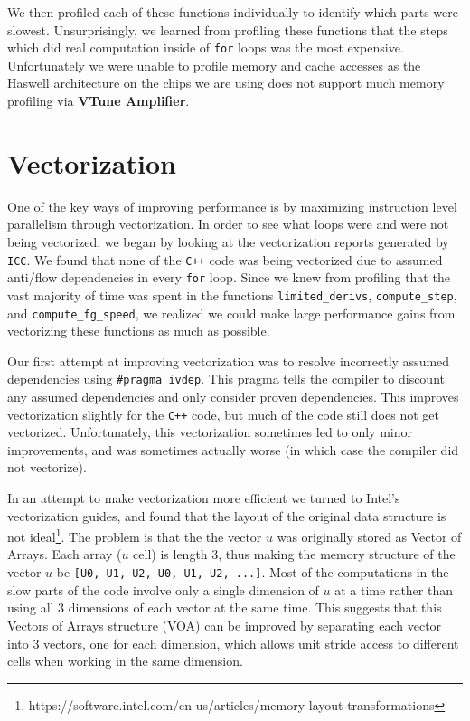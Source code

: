 \documentclass[11pt]{article}
\newcommand{\ttt}{\texttt}
\begin{document}
We then profiled each of these functions individually to identify which parts were slowest. Unsurprisingly, we learned from profiling these functions that the steps which did real computation inside of \ttt{for} loops was the most expensive. Unfortunately we were unable to profile memory and cache accesses as the Haswell architecture on the chips we are using does not support much memory profiling via \textbf{VTune Amplifier}.

\section{Vectorization}

One of the key ways of improving performance is by maximizing instruction level parallelism through vectorization. In order to see what loops were and were not being vectorized, we began by looking at the vectorization reports generated by \ttt{ICC}. We found that none of the \ttt{C++} code was being vectorized due to assumed anti/flow dependencies in every \ttt{for} loop. Since we knew from profiling that the vast majority of time was spent in the functions \ttt{limited\_derivs}, \ttt{compute\_step}, and \ttt{compute\_fg\_speed}, we realized we could make large performance gains from vectorizing these functions as much as possible.

Our first attempt at improving vectorization was to resolve incorrectly assumed dependencies using \ttt{\#pragma ivdep}. This pragma tells the compiler to discount any assumed dependencies and only consider proven dependencies. This improves vectorization slightly for the \ttt{C++} code, but much of the code still does not get vectorized. Unfortunately, this vectorization sometimes led to only minor improvements, and was sometimes actually worse (in which case the compiler did not vectorize).

In an attempt to make vectorization more efficient we turned to Intel's vectorization guides, and found that the layout of the original data structure is not ideal\footnote{https://software.intel.com/en-us/articles/memory-layout-transformations}. The problem is that the the vector $u$ was originally stored as Vector of Arrays. Each array ($u$ cell) is length 3, thus making the memory structure of the vector $u$ be \ttt{[U0, U1, U2, U0, U1, U2, ...]}. Most of the computations in the slow parts of the code involve only a single dimension of $u$ at a time rather than using all 3 dimensions of each vector at the same time. This suggests that this Vectors of Arrays structure (VOA) can be improved by separating each vector into 3 vectors, one for each dimension, which allows unit stride access to different cells when working in the same dimension.
\end{document}
